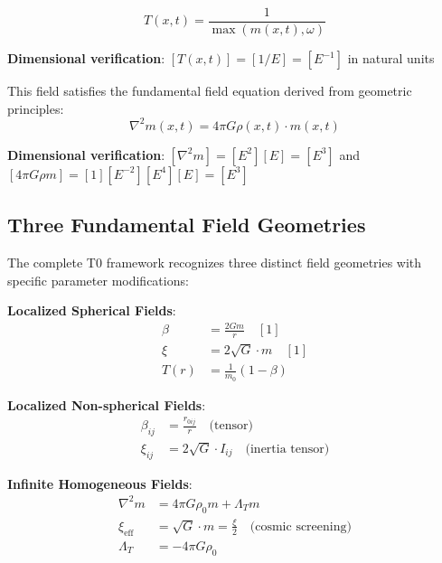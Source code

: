 \documentclass[12pt,a4paper]{article}
\newcommand{\Tfield}{T(x,t)}
\newcommand{\mfield}{m(x,t)}
\theoremstyle{definition}
\theoremstyle{remark}
\begin{document}
	\begin{equation}
		\boxed{\Tfield = \frac{1}{\max(\mfield, \omega)}}
		\label{eq:intrinsic_time_field}
	\end{equation}
	
	\textbf{Dimensional verification}: $[\Tfield] = [1/E] = [E^{-1}]$ in natural units \checkmark
	
	This field satisfies the fundamental field equation derived from geometric principles:
	\begin{equation}
		\nabla^2 \mfield = 4\pi G \rho(x,t) \cdot \mfield
		\label{eq:field_equation}
	\end{equation}
	
	\textbf{Dimensional verification}: $[\nabla^2 m] = [E^2][E] = [E^3]$ and $[4\pi G \rho m] = [1][E^{-2}][E^4][E] = [E^3]$ \checkmark
	
	\subsection{Three Fundamental Field Geometries}
	\label{subsec:three_geometries}
	
	The complete T0 framework recognizes three distinct field geometries with specific parameter modifications:
	
	\begin{tcolorbox}[colback=blue!5!white,colframe=blue!75!black,title=T0 Model Parameter Framework]
		\textbf{Localized Spherical Fields}:
		\begin{align}
			\beta &= \frac{2Gm}{r} \quad [1] \\
			\xi &= 2\sqrt{G} \cdot m \quad [1] \\
			T(r) &= \frac{1}{m_0}(1 - \beta)
		\end{align}
		
		\textbf{Localized Non-spherical Fields}:
		\begin{align}
			\beta_{ij} &= \frac{r_{0ij}}{r} \quad \text{(tensor)} \\
			\xi_{ij} &= 2\sqrt{G} \cdot I_{ij} \quad \text{(inertia tensor)}
		\end{align}
		
		\textbf{Infinite Homogeneous Fields}:
		\begin{align}
			\nabla^2 m &= 4\pi G \rho_0 m + \Lambda_T m \\
			\xi_{\text{eff}} &= \sqrt{G} \cdot m = \frac{\xi}{2} \quad \text{(cosmic screening)} \\
			\Lambda_T &= -4\pi G \rho_0
		\end{align}
	\end{tcolorbox}
	
\end{document}
